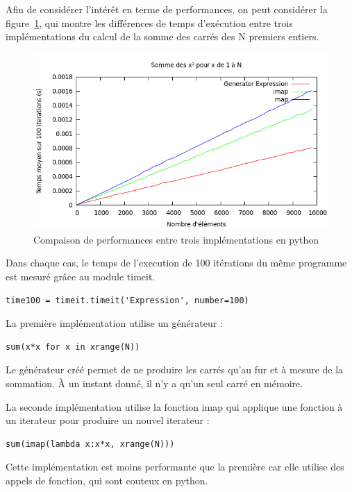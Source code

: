 \documentclass[a4paper]{article}
\begin{document}
Afin de considérer l'intérêt en terme de performances, on peut considérer la figure~\ref{GenExpMapImapPy}, qui montre les différences de temps d'exécution entre trois implémentations du calcul de la somme des carrés des N premiers entiers. 

\begin{figure}[h]
  \includegraphics[scale=0.5]{./Pictures/GenExpMapImapPy}
  \caption{Compaison de performances entre trois implémentations en python}
  \label{GenExpMapImapPy}
\end{figure}

Dans chaque cas, le temps de l'execution de 100 itérations du même programme est mesuré grâce au module timeit.

\begin{verbatim}
time100 = timeit.timeit('Expression', number=100)
\end{verbatim}

La première implémentation utilise un générateur :

\begin{verbatim}
sum(x*x for x in xrange(N))
\end{verbatim}

Le générateur créé permet de ne produire les carrés qu'au fur et à mesure de la sommation. À un instant donné, il n'y a qu'un seul carré en mémoire.


La seconde implémentation utilise la fonction imap qui applique une fonction à un iterateur pour produire un nouvel iterateur :

\begin{verbatim}
sum(imap(lambda x:x*x, xrange(N)))
\end{verbatim}

Cette implémentation est moins performante que la première car elle utilise des appels de fonction, qui sont couteux en python.
\end{document}

